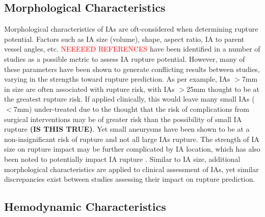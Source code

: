 \subsection{Morphological Characteristics}

Morphological characteristics of IAs are oft-considered when determining rupture potential. Factors such as IA size (volume), shape, aspect ratio, IA to parent vessel angles, etc. \textcolor{red}{NEEEEED REFERENCES} have been identified in a number of studies as a possible metric to assess IA rupture potential. However, many of these parameters have been shown to generate conflicting results between studies, varying in the strengths toward rupture prediction. As per example, IAs $>$7mm in size are often associated with rupture risk, with IAs $>$25mm thought to be at the greatest rupture risk. If applied clinically, this would leave many small IAs ($<$7mm) under-treated due to the thought that the risk of complications from surgical interventions may be of greater risk than the possibility of small IA rupture \textbf{(IS THIS TRUE)}. Yet small aneurysms have been shown to be at a non-insignificant risk of rupture \cite{duan2018morphological} and not all large IAs rupture. The strength of IA size on rupture impact may be further complicated by IA location, which has also been noted to potentially impact IA rupture \cite{ucas2012natrual,weir2002sizes}. Similar to IA size, additional morphological characteristics are applied to clinical assessment of IAs, yet similar discrepancies exist between studies assessing their impact on rupture prediction.

\subsection{Hemodynamic Characteristics}

